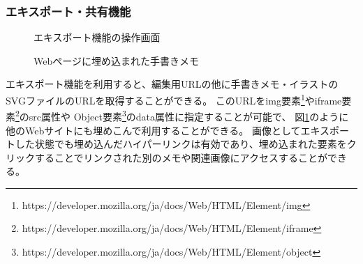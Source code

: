 \subsubsection{エキスポート・共有機能}

\begin{figure}[htbp] \begin{minipage}{0.5\hsize}
                         \begin{center} 
                         \end{center} \caption{エキスポート機能の操作画面} \label{fig:exporting1}
\end{minipage} \begin{minipage}{0.5\hsize}
                   \begin{center} 
                   \end{center} \caption{Webページに埋め込まれた手書きメモ} \label{fig:exporting2}
\end{minipage}
\end{figure}
エキスポート機能を利用すると、編集用URLの他に手書きメモ・イラストのSVGファイルのURLを取得することができる。
このURLをimg要素\footnote{https://developer.mozilla.org/ja/docs/Web/HTML/Element/img}やiframe要素\footnote{https://developer.mozilla.org/ja/docs/Web/HTML/Element/iframe}のsrc属性や
Object要素\footnote{https://developer.mozilla.org/ja/docs/Web/HTML/Element/object}のdata属性に指定することが可能で、
図\ref{fig:exporting2}のように他のWebサイトにも埋めこんで利用することができる。
画像としてエキスポートした状態でも埋め込んだハイパーリンクは有効であり、埋め込まれた要素をクリックすることでリンクされた別のメモや関連画像にアクセスすることができる。


